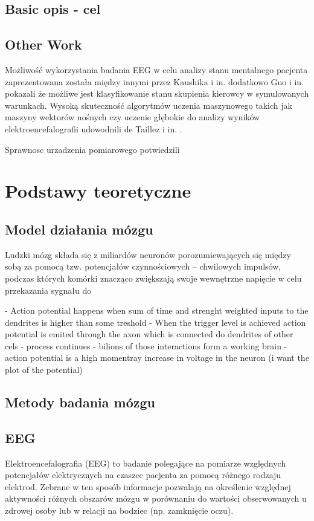 \documentclass{./assets/wfis}
\begin{document}
\section{Basic opis - cel}
\section{Other Work}

Możliwość wykorzystania badania EEG w celu analizy stanu mentalnego pacjenta zaprezentowana została między innymi przez Kaushika i in. \cite{kaushik_decoding_2022} dodatkowo Guo i in. \cite{guo_detection_2018} pokazali że możliwe jest klasyfikowanie stanu skupienia kierowcy w symulowanych warunkach. Wysoką skuteczność algorytmów uczenia maszynowego takich jak maszyny wektorów nośnych czy uczenie głębokie do analizy wyników elektroencefalografii udowodnili de Taillez i in. \cite{de_taillez_machine_2020}.

Sprawnosc urzadzenia pomiarowego potwiedzili 

\chapter{Podstawy teoretyczne}
\section{Model działania mózgu}

Ludzki mózg składa się z miliardów neuronów porozumiewających się między sobą za pomocą tzw. potencjałów czynnościowych – chwilowych impulsów, podczas których komórki znacząco zwiększają swoje wewnętrzne napięcie w celu przekazania sygnału do

- Action potential happens when sum of time and strenght weighted inputs to the dendrites is higher than some treshold
- When the trigger level is achieved action potential is emited through the axon which is connected do dendrites of other cels - process continues
- bilions of those interactions form a working brain
- action potential is a high momentray increase in voltage in the neuron (i want the plot of the potential)

\section{Metody badania mózgu}



\section{EEG}
Elektroencefalografia (EEG) to badanie polegające na pomiarze względnych potencjałów elektrycznych na czaszce pacjenta za pomocą różnego rodzaju elektrod. Zebrane w ten sposób informacje pozwalają na określenie względnej aktywności różnych obszarów mózgu w porównaniu do wartości obserwowanych u zdrowej osoby lub w relacji na bodziec (np. zamknięcie oczu).
\end{document}
